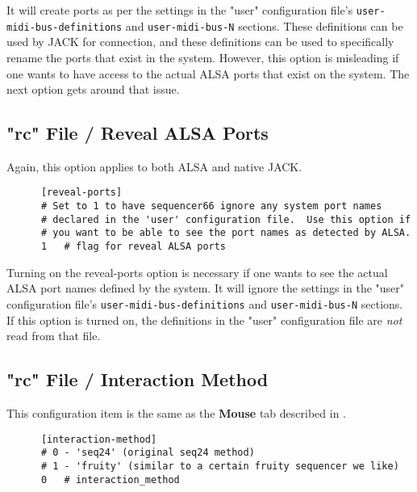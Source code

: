    It will create ports as per the settings in the "user" configuration file's
   \texttt{user-midi-bus-definitions} and \texttt{user-midi-bus-N} sections.
   These definitions can be used by JACK for connection, and these definitions
   can be used to specifically rename the ports that exist in the system.
   However, this option is misleading if one wants to have access to the
   actual ALSA ports that exist on the system.
   The next option gets around that issue.

\subsection{"rc" File / Reveal ALSA Ports}
\label{subsec:seq66_rc_file_reveal_ports}

   Again, this option applies to both ALSA and native JACK.

   \begin{verbatim}
      [reveal-ports]
      # Set to 1 to have sequencer66 ignore any system port names
      # declared in the 'user' configuration file.  Use this option if
      # you want to be able to see the port names as detected by ALSA.
      1   # flag for reveal ALSA ports
   \end{verbatim}

   Turning on the reveal-ports option is necessary if one
   wants to see the actual ALSA port names defined by the system.
   It will ignore the settings in the "user" configuration file's
   \texttt{user-midi-bus-definitions} and \texttt{user-midi-bus-N} sections.
   If this option is turned on, the definitions in the
   "user" configuration file are \textsl{not} read from that file.

\subsection{"rc" File / Interaction Method}
\label{subsec:seq66_rc_file_interaction}

   This configuration item is the same as the 
   \textbf{Mouse} tab described in
   .

   \begin{verbatim}
      [interaction-method]
      # 0 - 'seq24' (original seq24 method)
      # 1 - 'fruity' (similar to a certain fruity sequencer we like)
      0   # interaction_method
   \end{verbatim}


